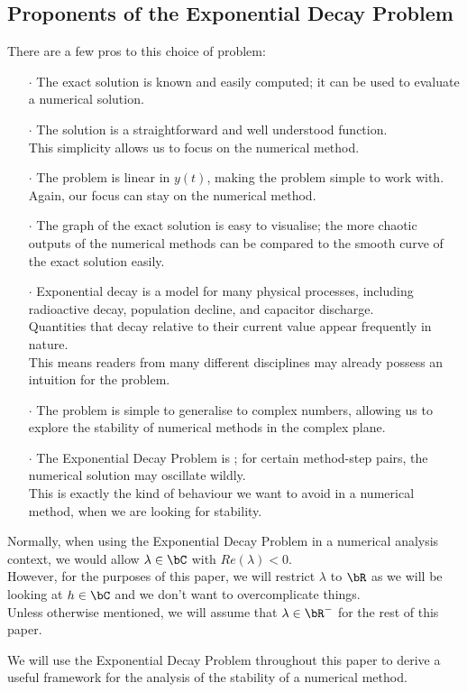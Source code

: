 \subsection{Proponents of the Exponential Decay Problem}
\par There are a few pros to this choice of problem:
\begin{itemize}
    \item[$\cdot$] The exact solution is known and easily computed; it can be used to evaluate a numerical solution.
    \item[$\cdot$] The solution is a straightforward and well understood function.\\
    	  This simplicity allows us to focus on the numerical method.
    \item[$\cdot$] The problem is linear in $y(t)$, making the problem simple to work with.\\
    	  Again, our focus can stay on the numerical method.
    \item[$\cdot$] The graph of the exact solution is easy to visualise; the more chaotic outputs of the numerical methods can be compared to the smooth curve of the exact solution easily.
    \item[$\cdot$] Exponential decay is a model for many physical processes, including radioactive decay, population decline, and capacitor discharge.\\
    	  Quantities that decay relative to their current value appear frequently in nature.\\
    	  This means readers from many different disciplines may already possess an intuition for the problem.
    \item[$\cdot$] The problem is simple to generalise to complex numbers, allowing us to explore the stability of numerical methods in the complex plane.
    \item[$\cdot$] The Exponential Decay Problem is ; for certain method-step pairs, the numerical solution may oscillate wildly.\\
    	  This is exactly the kind of behaviour we want to avoid in a numerical method, when we are looking for stability.
\end{itemize}

\par Normally, when using the Exponential Decay Problem in a numerical analysis context, we would allow $\lambda \in \bC$ with $Re(\lambda)<0$.\\
However, for the purposes of this paper, we will restrict $\lambda$ to $\bR$ as we will be looking at $h \in \bC$ and we don't want to overcomplicate things.\\
Unless otherwise mentioned, we will assume that $\lambda \in \bR^{-}$ for the rest of this paper.\\

\par We will use the Exponential Decay Problem throughout this paper to derive a useful framework for the analysis of the stability of a numerical method.\\
